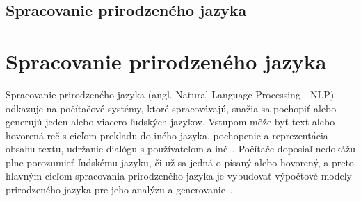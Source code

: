 \newpage
%
%
{
	\section{Spracovanie prirodzeného jazyka} 
}
{
	\chapter{Spracovanie prirodzeného jazyka}
}
\label{analysis}

%
%
\label{subsec:nlp}
Spracovanie prirodzeného jazyka (angl. Natural Language Processing - NLP) odkazuje na počítačové systémy, ktoré spracovávajú, snažia sa pochopiť alebo generujú jeden alebo viacero ľudských jazykov. Vstupom môže byť text alebo hovorená reč s cieľom prekladu do iného jazyka, pochopenie a reprezentácia obsahu textu, udržanie dialógu s používateľom a iné~\cite{AllenNLP}. Počítače doposiaľ nedokážu plne porozumieť ľudskému jazyku, či už sa jedná o písaný alebo hovorený, a preto hlavným cieľom spracovania prirodzeného jazyka je vybudovať výpočtové modely prirodzeného jazyka pre jeho analýzu a generovanie~\cite{Bharati1995}.


